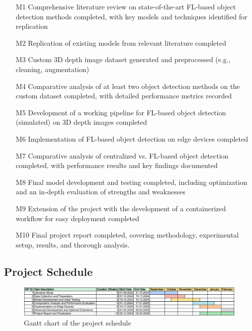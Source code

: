 \documentclass[thesis]{mas_proposal}
\begin{document}
\begin{enumerate}
      \item[M1] Comprehensive literature review on state-of-the-art FL-based object detection methods completed, with key models and techniques identified for replication
      \item[M2] Replication of existing models from relevant literature completed
      \item[M3] Custom 3D depth image dataset generated and preprocessed (e.g., cleaning, augmentation)
      \item[M4] Comparative analysis of at least two object detection methods on the custom dataset completed, with detailed performance metrics recorded
      \item[M5] Development of a working pipeline for FL-based object detection (simulated) on 3D depth images completed
      \item[M6] Implementation of FL-based object detection on edge devices completed
      \item[M7] Comparative analysis of centralized vs. FL-based object detection completed, with performance results and key findings documented
      \item[M8] Final model development and testing completed, including optimization and an in-depth evaluation of strengths and weaknesses
      \item[M9] Extension of the project with the development of a containerized workflow for easy deployment completed
      \item[M10] Final project report completed, covering methodology, experimental setup, results, and thorough analysis.
\end{enumerate}

\subsection{Project Schedule}

\begin{figure}[h]
      \hspace{-4em}
      \includegraphics[scale=0.3]{images/project_plan/Gantt_chart.png}
      \caption{Gantt chart of the project schedule}
      \label{fig:myfigure}
\end{figure}
\end{document}
